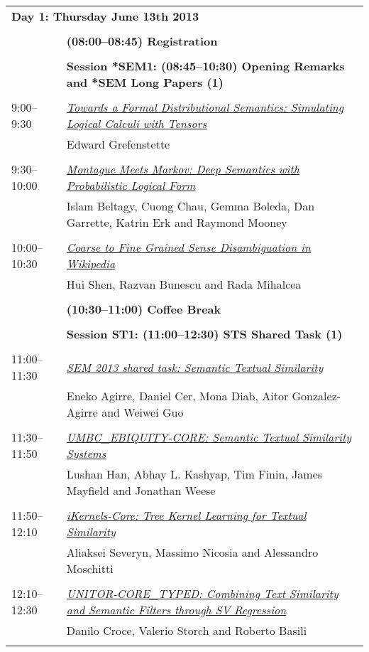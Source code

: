 \begin{tabular}{p{20mm}p{128mm}}
\multicolumn{2}{l}{\bf Day 1: Thursday June 13th 2013} \\
\\
 & {\bf (08:00--08:45) Registration} \\
\\
 & {\bf Session *SEM1: (08:45--10:30) Opening Remarks and *SEM Long Papers (1)} \\
\\
9:00--9:30 & \hyperlink{page.1}{\em Towards a Formal Distributional Semantics: Simulating Logical Calculi with Tensors}\\
         & Edward Grefenstette \\
\\

9:30--10:00 & \hyperlink{page.11}{\em Montague Meets Markov: Deep Semantics with Probabilistic Logical Form}\\
         & Islam Beltagy, Cuong Chau, Gemma Boleda, Dan Garrette, Katrin Erk and Raymond Mooney \\
\\

10:00--10:30 & \hyperlink{page.22}{\em Coarse to Fine Grained Sense Disambiguation in Wikipedia}\\
         & Hui Shen, Razvan Bunescu and Rada Mihalcea \\
\\

 & {\bf (10:30--11:00) Coffee Break} \\
\\
 & {\bf Session ST1: (11:00--12:30) STS Shared Task (1)} \\
\\
11:00--11:30 & \hyperlink{page.32}{\em *SEM 2013 shared task: Semantic Textual Similarity}\\
         & Eneko Agirre, Daniel Cer, Mona Diab, Aitor Gonzalez-Agirre and Weiwei Guo \\
\\

11:30--11:50 & \hyperlink{page.44}{\em UMBC\_EBIQUITY-CORE: Semantic Textual Similarity Systems}\\
         & Lushan Han, Abhay L. Kashyap, Tim Finin, James Mayfield and Jonathan Weese \\
\\

11:50--12:10 & \hyperlink{page.53}{\em iKernels-Core: Tree Kernel Learning for Textual Similarity}\\
         & Aliaksei Severyn, Massimo Nicosia and Alessandro Moschitti \\
\\

12:10--12:30 & \hyperlink{page.59}{\em UNITOR-CORE\_TYPED: Combining Text Similarity and Semantic Filters through SV Regression}\\
         & Danilo Croce, Valerio Storch and Roberto Basili \\
\\

\end{tabular}
